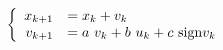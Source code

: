 \documentclass{article}
\begin{document}
\thispagestyle{empty}
\newcommand{\sign}{\text{sign}}


$$
\left \{ \begin{array}{r l}
x_{k+1} & = x_k + v_k\\
v_{k+1} & = a~v_k + b~u_k + c~\sign{v_k}
\end{array} \right.
$$
\end{document}
